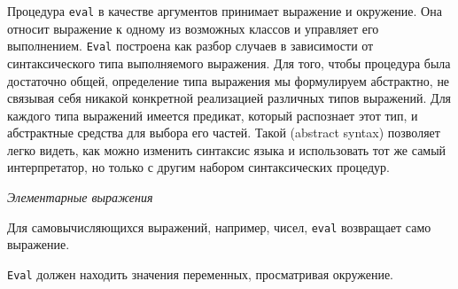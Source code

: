 Процедура {\tt eval}
в качестве аргументов принимает
выражение и окружение. Она относит выражение к одному из возможных
классов и управляет его выполнением. {\tt Eval} построена как
разбор случаев в зависимости от синтаксического
типа выполняемого выражения.  Для того, чтобы процедура была
достаточно общей, определение типа выражения мы формулируем абстрактно,
не связывая себя никакой конкретной 
реализацией различных типов выражений.  Для каждого типа
выражений имеется предикат, который 
распознает этот тип, и абстрактные 
средства для выбора его частей. Такой 
 (abstract syntax)
позволяет легко видеть, как можно изменить синтаксис языка и
использовать тот же самый интерпретатор, но только с другим набором
синтаксических процедур.

\medskip
{\em Элементарные выражения}
\begin{plainlist}
\item
 Для самовычисляющихся
выражений, например, чисел, {\tt eval} возвращает само выражение.

\item
{\tt Eval} должен  находить значения переменных, просматривая окружение.
\end{plainlist}

\medskip

